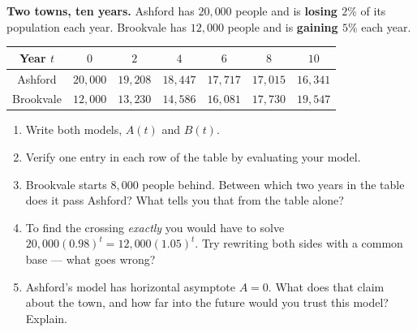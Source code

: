 \documentclass[10pt]{article}
\begin{document}
\begin{extensionbox}
\textbf{Two towns, ten years.} Ashford has $20{,}000$ people and is \textbf{losing $2\%$} of its
population each year. Brookvale has $12{,}000$ people and is \textbf{gaining $5\%$} each year.
\begin{center}
\renewcommand{\arraystretch}{1.25}
\begin{tabular}{|c|c|c|c|c|c|c|}
\hline
Year $t$ & $0$ & $2$ & $4$ & $6$ & $8$ & $10$ \\ \hline
Ashford & $20{,}000$ & $19{,}208$ & $18{,}447$ & $17{,}717$ & $17{,}015$ & $16{,}341$ \\ \hline
Brookvale & $12{,}000$ & $13{,}230$ & $14{,}586$ & $16{,}081$ & $17{,}730$ & $19{,}547$ \\ \hline
\end{tabular}
\end{center}
\begin{enumerate}[label=(\alph*), leftmargin=1.8em, itemsep=5pt]
  \item Write both models, $A(t)$ and $B(t)$.
  \item Verify one entry in each row of the table by evaluating your model.
  \item Brookvale starts $8{,}000$ people behind. Between which two years in the table does it pass
        Ashford? What tells you that from the table alone?
  \item To find the crossing \emph{exactly} you would have to solve
        $20{,}000(0.98)^{t} = 12{,}000(1.05)^{t}$. Try rewriting both sides with a common base ---
        what goes wrong?
  \item Ashford's model has horizontal asymptote $A=0$. What does that claim about the town, and how
        far into the future would you trust this model? Explain.
\end{enumerate}
\end{extensionbox}
\end{document}
